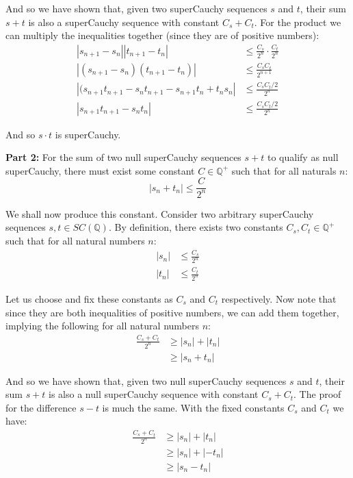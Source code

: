 \documentclass{article}
\begin{document}
And so we have shown that, given two superCauchy sequences $s$ and $t$, their sum $s+t$ is also a superCauchy sequence with constant $C_s+C_t$. For the product we can multiply the inequalities together (since they are of positive numbers):
\begin{align*}
    |s_{n+1}-s_n||t_{n+1}-t_n|&\le\frac{C_s}{2^n}\cdot\frac{C_t}{2^n}\tag{product of (1) and (2)}\\
    |(s_{n+1}-s_n)(t_{n+1}-t_n)|&\le\frac{C_sC_t}{2^{n+1}}\tag{product of absolute values}\\
    |(s_{n+1}t_{n+1}-s_nt_{n+1}-s_{n+1}t_n+t_ns_n|&\le\frac{C_sC_t/2}{2^{n}}\\
    |s_{n+1}t_{n+1}-s_nt_n|&\le\frac{C_sC_t/2}{2^{n}}
\end{align*}

And so $s\cdot t$ is superCauchy.
\bigskip

\noindent\textbf{Part 2:} For the sum of two null superCauchy sequences $s+t$ to qualify as null superCauchy, there must exist some constant $C\in\mathbb Q^+$ such that for all naturals $n$:
\begin{equation*}
    |s_n+t_n|\le\frac{C}{2^n}
\end{equation*}

We shall now produce this constant. Consider two arbitrary superCauchy sequences $s,t\in SC(\mathbb Q)$. By definition, there exists two constants $C_s,C_t\in\mathbb Q^+$ such that for all natural numbers $n$:
\setcounter{equation}{0}
\begin{align}
    |s_n|&\le\frac{C_s}{2^n}\\
    |t_n|&\le\frac{C_t}{2^n}
\end{align}

Let us choose and fix these constants as $C_s$ and $C_t$ respectively. Now note that since they are both inequalities of positive numbers, we can add them together, implying the following for all natural numbers $n$:
\begin{align*}
    \frac{C_s+C_t}{2^n}&\ge|s_n|+|t_n|\tag{sum of (1) and (2)}\\
    &\ge|s_n+t_n|\tag{triangle inequality}
\end{align*}

And so we have shown that, given two null superCauchy sequences $s$ and $t$, their sum $s+t$ is also a null superCauchy sequence with constant $C_s+C_t$. The proof for the difference $s-t$ is much the same. With the fixed constants $C_s$ and $C_t$ we have:
\begin{align*}
    \frac{C_s+C_t}{2^n}&\ge|s_n|+|t_n|\tag{sum of (1) and (2)}\\
    &\ge|s_n|+|-t_n|\tag{multiply by $-1$}\\
    &\ge|s_n-t_n|\tag{triangle inequality}
\end{align*}
\end{document}
